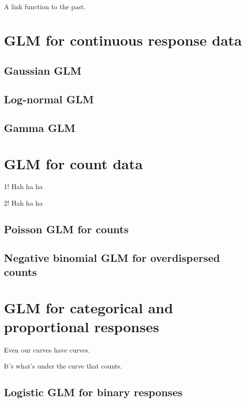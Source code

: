 \documentclass[
  13,
  letterpaper,
]{report}
\begin{document}
A link function to the past.

\chapter{GLM for continuous response data}\label{sec-glm2}

\section{Gaussian GLM}\label{sec-glm2-gauss}

\section{Log-normal GLM}\label{sec-glm2-lognorm}

\section{Gamma GLM}\label{sec-glm2-gamma}

\chapter{GLM for count data}\label{sec-glm3}

1! Hah ha ha

2! Hah ha ha

\section{Poisson GLM for counts}\label{sec-glm3-poisson}

\section{Negative binomial GLM for overdispersed
counts}\label{sec-glm3-poisson}

\chapter{GLM for categorical and proportional responses}\label{sec-glm4}

Even our curves have curves.

It's what's under the curve that counts.

\section{Logistic GLM for binary responses}\label{sec-glm4-logistic}
\end{document}
